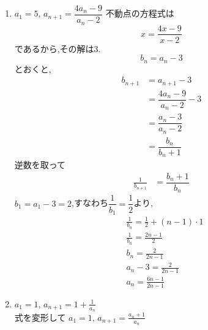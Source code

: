 \begin{enumerate}[label=(\arabic*),parsep=3pt]
\[            \]
            なので,
            \[
              b_n=\frac{a_n-2}{a_n+2}
            \]
            と置くと,
            \begin{align*}
              &b_{n+1}=-\frac13 b_n,\quad b_1=\frac{a_1-2}{a_1+2}=\frac{-2}{2}=-1\\
              &\therefore \quad b_n=(-1)\left(-\frac13\right)^{n-1}=\frac{(-1)^n}{3^{n-1}}
            \end{align*}
            \[
              b_n=\frac{a_n-2}{a_n+2}
            \]
            を$a_n$について解くと,
            \[
              a_n=\frac{2(1+b_n)}{1-b_n}
            \]
            となるので,
            \[
              b_n=\frac{(-1)^n}{3^{n-1}}
            \]
            を代入し,分母分子に$3^{n-1}$を掛けて整理すると,
            \[
              a_n=\frac{2\left(3^{n-1}+(-1)^n\right)}{3^{n-1}-(-1)^n}
            \]
            を得る.
      \item $\displaystyle a_1=5,\, a_{n+1}=\dfrac{4a_{n}-9}{a_{n}-2}$
            不動点の方程式は
            \[
              x=\frac{4x-9}{x-2}
            \]
            であるから,その解は3.
            \[
            b_n=a_n-3
            \]
            とおくと,
            \begin{align*}
              b_{n+1}&=a_{n+1}-3\\
              &=\dfrac{4a_{n}-9}{a_{n}-2}-3\\
              &=\dfrac{a_{n}-3}{a_{n}-2}\\
              &=\dfrac{b_{n}}{b_{n}+1}
            \end{align*}
            逆数を取って
            \begin{align*}
              \frac{1}{b_{n+1}}&=\dfrac{b_{n}+1}{b_{n}}
            \end{align*}
            $b_1=a_1-3=2$,すなわち$\dfrac1{b_1}=\dfrac12$より,
            \begin{align*}
              &\frac{1}{b_n}=\frac{1}{2}+(n-1)\cdot 1\\
              &\frac{1}{b_n}=\frac{2n-1}{2}\\
              &b_n=\frac{2}{2n-1}\\
              &a_n-3=\frac{2}{2n-1}\\
              &a_n=\frac{6n-1}{2n-1}
            \end{align*}
      \item $\displaystyle a_1=1,\, a_{n+1}=1+\frac{1}{a_n}$\\
            式を変形して
            $\displaystyle a_1=1,\, a_{n+1}=\frac{a_n+1}{a_n}$

\end{enumerate}
